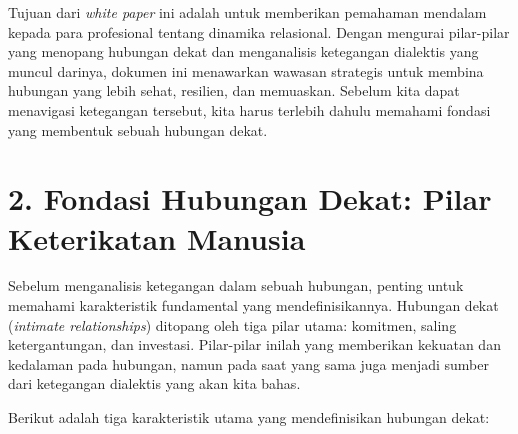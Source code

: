 \documentclass[
  letterpaper,
  DIV=11,
  numbers=noendperiod]{scrreprt}
\begin{document}
Tujuan dari \emph{white paper} ini adalah untuk memberikan pemahaman
mendalam kepada para profesional tentang dinamika relasional. Dengan
mengurai pilar-pilar yang menopang hubungan dekat dan menganalisis
ketegangan dialektis yang muncul darinya, dokumen ini menawarkan wawasan
strategis untuk membina hubungan yang lebih sehat, resilien, dan
memuaskan. Sebelum kita dapat menavigasi ketegangan tersebut, kita harus
terlebih dahulu memahami fondasi yang membentuk sebuah hubungan dekat.

\section{\texorpdfstring{\textbf{2. Fondasi Hubungan Dekat: Pilar
Keterikatan
Manusia}}{2. Fondasi Hubungan Dekat: Pilar Keterikatan Manusia}}\label{fondasi-hubungan-dekat-pilar-keterikatan-manusia}

Sebelum menganalisis ketegangan dalam sebuah hubungan, penting untuk
memahami karakteristik fundamental yang mendefinisikannya. Hubungan
dekat (\emph{intimate relationships}) ditopang oleh tiga pilar utama:
komitmen, saling ketergantungan, dan investasi. Pilar-pilar inilah yang
memberikan kekuatan dan kedalaman pada hubungan, namun pada saat yang
sama juga menjadi sumber dari ketegangan dialektis yang akan kita bahas.

Berikut adalah tiga karakteristik utama yang mendefinisikan hubungan
dekat:
\end{document}
